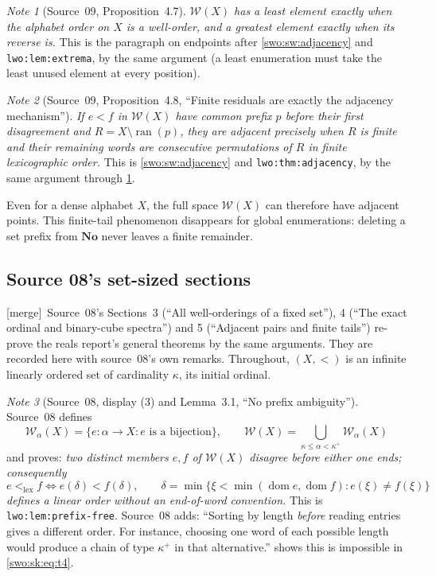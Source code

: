 \documentclass[11pt]{article}
\theoremstyle{definition}
\theoremstyle{remark}
\newtheorem{note}[note]{Note}
\newcommand{\No}{\mathbf{No}}
\newcommand{\WO}{\mathcal W}
\newcommand{\W}{\mathcal W}
\newcommand{\lex}{\mathrm{lex}}
\newcommand{\ran}{\operatorname{ran}}
\newcommand{\dom}{\operatorname{dom}}
\newcommand{\code}[1]{\texttt{\small #1}}
\newcommand{\merge}{\textsf{[merge]}}
\begin{document}

\begin{note}[Source~09, Proposition~4.7]\label{swo:ec:prop:endpoints}
\emph{$\WO(X)$ has a least element exactly when the alphabet order on $X$ is a
well-order, and a greatest element exactly when its reverse is.} This is the
paragraph on endpoints after \cref{swo:sw:adjacency} and
\code{lwo:lem:extrema}, by the same argument (a least enumeration must take the
least unused element at every position).
\end{note}

\begin{note}[Source~09, Proposition~4.8, ``Finite residuals are exactly the adjacency mechanism'']\label{swo:ec:prop:adjacent}
\emph{If $e<f$ in $\WO(X)$ have common prefix $p$ before their first
disagreement and $R=X\setminus\ran(p)$, they are adjacent precisely when $R$ is
finite and their remaining words are consecutive permutations of $R$ in finite
lexicographic order.} This is \cref{swo:sw:adjacency} and
\code{lwo:thm:adjacency}, by the same argument through
\cref{swo:ec:prop:endpoints}.
\end{note}

Even for a dense alphabet $X$, the full space $\WO(X)$ can therefore have
adjacent points. This finite-tail phenomenon disappears for global
enumerations: deleting a set prefix from $\No$ never leaves a finite
remainder.


\subsection{Source 08's set-sized sections}\label{swo:sk:sec:set}

\merge\ Source~08's Sections~3 (``All well-orderings of a fixed set''),
4 (``The exact ordinal and binary-cube spectra'')\label{swo:sk:sec:spectrum}
and 5 (``Adjacent pairs and finite tails'')\label{swo:sk:sec:adjacency}
re-prove the reals report's general theorems by the same arguments. They are
recorded here with source~08's own remarks. Throughout, $(X,<)$ is an infinite
linearly ordered set of cardinality $\kappa$, its initial ordinal.

\begin{note}[Source~08, display (3) and Lemma~3.1, ``No prefix ambiguity'']\label{swo:sk:lem:noprefix}
Source~08 defines
\[
 \W_\alpha(X)=\{e:\alpha\to X:e\text{ is a bijection}\},
 \qquad
 \W(X)=\bigcup_{\kappa\leq\alpha<\kappa^+}\W_\alpha(X)
 \tag{S08.3}\label{swo:sk:eq:t3}
\]
and proves: \emph{two distinct members $e,f$ of $\W(X)$ disagree before either
one ends; consequently}
\[
 e<_{\lex}f\iff e(\delta)<f(\delta),\qquad
 \delta=\min\{\xi<\min(\dom e,\dom f):e(\xi)\ne f(\xi)\}
 \tag{S08.4}\label{swo:sk:eq:t4}
\]
\emph{defines a linear order without an end-of-word convention.} This is
\code{lwo:lem:prefix-free}. Source~08 adds: ``Sorting by length
\emph{before} reading entries gives a different order. For instance, choosing
one word of each possible length would produce a chain of type $\kappa^+$ in
that alternative.''  shows this is impossible in
\eqref{swo:sk:eq:t4}.
\end{note}
\end{document}
